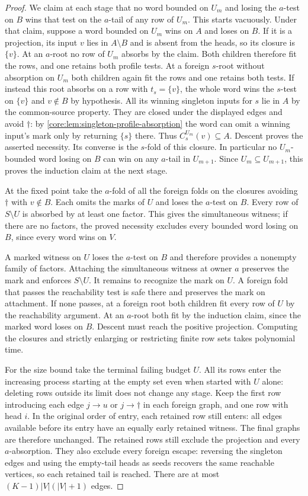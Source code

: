 \begin{proof}
We claim at each stage that no word bounded on $U_m$ and losing the
$a$-test on $B$ wins that test on the $a$-tail of any row of $U_m$.
This starts vacuously. Under that claim, suppose a word bounded on
$U_m$ wins on $A$ and loses on $B$. If it is a projection, its input
$v$ lies in $A\setminus B$ and is absent from the heads, so its closure is $\{v\}$.
At an $a$-root no row of $U_m$ absorbs by the claim. Both children
therefore fit the rows, and one retains both profile tests.
At a foreign $s$-root without absorption on $U_m$ both children
again fit the rows and one retains both tests. If instead this root
absorbs on a row with $t_s=\{v\}$, the whole word wins the $s$-test
on $\{v\}$ and $v\notin B$ by hypothesis. All its winning singleton
inputs for $s$ lie in $A$ by the common-source property. They are
closed under the displayed edges and avoid $\dagger$: by
\cref{core:lem:singleton-profile-absorption} the word can omit a
winning input's mark only by returning $\{s\}$ there. Thus
$C_s^{U_m}(v)\subseteq A$. Descent proves the asserted necessity.
Its converse is the $s$-fold of this closure. In particular no
$U_m$-bounded word losing on $B$ can win on any $a$-tail in
$U_{m+1}$. Since $U_m\subseteq U_{m+1}$, this proves the induction
claim at the next stage.

At the fixed point take the $a$-fold of all the foreign folds on the
closures avoiding $\dagger$ with $v\notin B$. Each omits the marks of
$U$ and loses the $a$-test on $B$. Every row of $S\setminus U$ is
absorbed by at least one factor. This gives the simultaneous witness;
if there are no factors, the proved necessity excludes every bounded
word losing on $B$, since every word wins on $V$.

A marked witness on $U$ loses the $a$-test on $B$ and therefore
provides a nonempty family of factors. Attaching the simultaneous
witness at owner $a$ preserves the mark and enforces $S\setminus U$.
It remains to recognize the mark on $U$. A foreign fold that passes
the reachability test is safe there and preserves the mark on attachment.
If none passes, at a foreign root both children fit every row of $U$
by the reachability argument. At an $a$-root both fit by the induction
claim, since the marked word loses on $B$. Descent must reach the
positive projection. Computing the closures and strictly enlarging or
restricting finite row sets takes polynomial time.

For the size bound take the terminal failing budget $U$. All its rows
enter the increasing process starting at the empty set even when
started with $U$ alone: deleting rows outside its limit does not change
any stage. Keep the first row introducing each edge $j\to u$ or
$j\to\dagger$ in each foreign graph, and one row with head $i$.
In the original order of entry, each retained row still enters: all
edges available before its entry have an equally early retained witness.
The final graphs are therefore unchanged. The retained rows still
exclude the projection and every $a$-absorption. They also exclude
every foreign escape: reversing the singleton edges and using
the empty-tail heads as seeds recovers the same reachable vertices,
so each retained tail is reached. There are at most
$(K-1)|V|(|V|+1)$ edges.
\end{proof}
